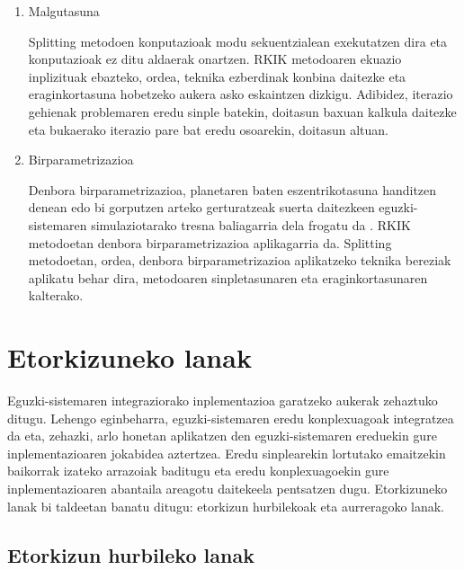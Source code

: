 \begin{enumerate}
\item Malgutasuna

Splitting metodoen konputazioak modu sekuentzialean exekutatzen dira eta konputazioak ez ditu aldaerak onartzen. RKIK metodoaren ekuazio inplizituak ebazteko, ordea, teknika ezberdinak konbina daitezke eta eraginkortasuna hobetzeko aukera asko eskaintzen dizkigu. Adibidez, iterazio gehienak problemaren eredu sinple batekin, doitasun baxuan kalkula daitezke  \cite{Beylkin2014} eta bukaerako iterazio pare bat eredu osoarekin, doitasun altuan.

\item Birparametrizazioa

Denbora birparametrizazioa, planetaren baten eszentrikotasuna handitzen denean edo bi gorputzen arteko gerturatzeak suerta daitezkeen eguzki-sistemaren simulaziotarako tresna baliagarria dela frogatu da \cite{Fukushima2007,Rauch1998}.  RKIK metodoetan denbora birparametrizazioa aplikagarria da. Splitting metodoetan, ordea, denbora birparametrizazioa aplikatzeko  teknika bereziak aplikatu behar dira, metodoaren sinpletasunaren eta eraginkortasunaren kalterako.
\end{enumerate}


\section*{Etorkizuneko lanak}

Eguzki-sistemaren integraziorako inplementazioa garatzeko aukerak zehaztuko ditugu. Lehengo eginbeharra, eguzki-sistemaren eredu konplexuagoak integratzea da eta, zehazki, arlo honetan  aplikatzen den eguzki-sistemaren ereduekin \cite{Laskar2011} gure inplementazioaren jokabidea aztertzea. Eredu sinplearekin lortutako emaitzekin baikorrak izateko arrazoiak baditugu eta eredu konplexuagoekin gure inplementazioaren abantaila areagotu daitekeela pentsatzen dugu. Etorkizuneko lanak bi taldeetan banatu ditugu: etorkizun hurbilekoak eta aurreragoko lanak.

\subsection*{Etorkizun hurbileko lanak}

